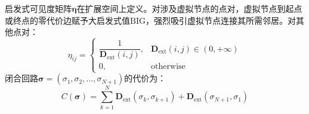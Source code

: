 \documentclass[lettersize,journal]{IEEEtran}
\begin{document}
启发式可见度矩阵$\bm{\eta}$在扩展空间上定义。对涉及虚拟节点的点对，虚拟节点到起点或终点的零代价边赋予大启发式值$\mathrm{BIG}$，强烈吸引虚拟节点连接其所需邻居。对其他点对：
\begin{equation}
\eta_{ij} =
\begin{cases}
\dfrac{1}{\mathbf{D}_{\mathrm{ext}}(i,j)}, & \mathbf{D}_{\mathrm{ext}}(i,j) \in (0, +\infty) \\
0, & \text{otherwise}
\end{cases}
\label{eq:eta}
\end{equation}
闭合回路$\bm{\sigma} = (\sigma_1, \sigma_2, \dots, \sigma_{N+1})$的代价为：
\begin{equation}
C(\bm{\sigma}) = \sum_{k=1}^{N} \mathbf{D}_{\mathrm{ext}}(\sigma_k, \sigma_{k+1}) + \mathbf{D}_{\mathrm{ext}}(\sigma_{N+1}, \sigma_1)
\label{eq:tourcost}
\end{equation}
\end{document}

